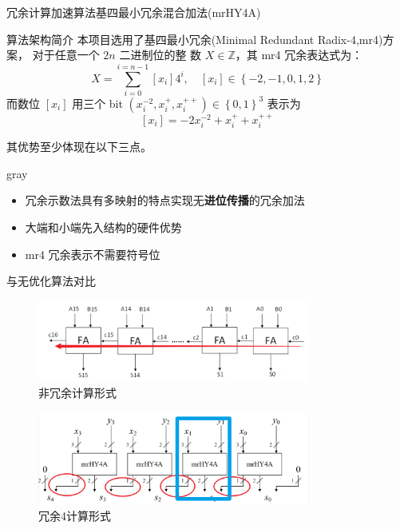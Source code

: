 \documentclass[8pt]{ctexbeamer}
\renewenvironment{quote}
{
	\begin{notebox}{gray}
}
{
	\end{notebox}
}
\begin{document}
\begin{frame}{冗余计算加速算法}{基四最小冗余混合加法(mrHY4A)}
	\begin{block}{算法架构简介}
		本项目选用了基四最小冗余(Minimal Redundant Radix-4,mr4)方案，
		对于任意一个 $2n$ 二进制位的整
		数 $X \in \mathbb{Z}$，其 mr4 冗余表达式为：
		\[
			X = \sum_{i=0}^{i=n-1} [x_i] 4^i,\quad [x_i] \in \left\{-2,-1,0,1,2\right\} 
		\]
		而数位 $[x_i] $ 用三个 bit $(x_i^{-2} , x_i^{+}, x_i^{++}) \in \left\{0,1\right\}^{3}$ 表示为
		\[
			[x_i] = -2 x_i^{-2}	+ x_i^+ + x_i^{++}
		\]
	\end{block}
	
	其优势至少体现在以下三点。

	\begin{quote}
		\begin{itemize}
			\item 冗余示数法具有多映射的特点实现无\textbf{进位传播}的冗余加法
			\item 大端和小端先入结构的硬件优势
			\item mr4 冗余表示不需要符号位
		\end{itemize}
	\end{quote}
\end{frame}

\begin{frame}{与无优化算法对比}
	\begin{center}
		\begin{figure}
			\includegraphics[width=0.8\textwidth]{figure/NonRedundant.png}
			\caption{非冗余计算形式}
			\label{fig:NonR}
		\end{figure}
		\begin{figure}
			\includegraphics[width=0.8\textwidth]{figure/Redundant.png}
			\caption{冗余4计算形式}
			\label{fig:R}
		\end{figure}
	\end{center}
\end{frame}
\end{document}
